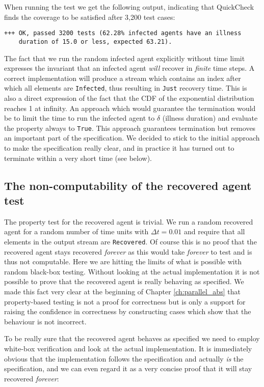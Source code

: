 When running the test we get the following output, indicating that QuickCheck finds the coverage to be satisfied after 3,200 test cases:

\begin{verbatim}
+++ OK, passed 3200 tests (62.28% infected agents have an illness 
    duration of 15.0 or less, expected 63.21).
\end{verbatim}

The fact that we run the random infected agent explicitly without time limit expresses the invariant that an infected agent \textit{will} recover in \textit{finite} time steps. A correct implementation will produce a stream which contains an index after which all elements are \texttt{Infected}, thus resulting in \texttt{Just} recovery time. This is also a direct expression of the fact that the CDF of the exponential distribution reaches 1 at infinity. An approach which would guarantee the termination would be to limit the time to run the infected agent to $\delta$ (illness duration) and evaluate the property always to \texttt{True}. This approach guarantees termination but removes an important part of the specification. We decided to stick to the initial approach to make the specification really clear, and in practice it has turned out to terminate within a very short time (see below).

\subsection{The non-computability of the recovered agent test}
The property test for the recovered agent is trivial. We run a random recovered agent for a random number of time units with $\Delta t = 0.01$ and require that all elements in the output stream are \texttt{Recovered}. Of course this is no proof that the recovered agent stays recovered \textit{forever} as this would take \textit{forever} to test and is thus not computable. Here we are hitting the limits of what is possible with random black-box testing. Without looking at the actual implementation it is not possible to prove that the recovered agent is really behaving as specified. We made this fact very clear at the beginning of Chapter \ref{ch:parallel_abs} that property-based testing is not a proof for correctness but is only a support for raising the confidence in correctness by constructing cases which show that the behaviour is not incorrect.

To be really sure that the recovered agent behaves as specified we need to employ white-box verification and look at the actual implementation. It is immediately obvious that the implementation follows the specification and actually \textit{is} the specification, and we can even regard it as a very concise proof that it will stay recovered \textit{forever}:

